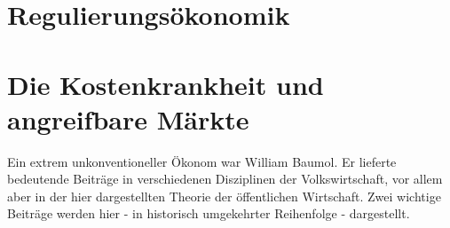 \section{Regulierungsökonomik}
\label{sec: Regulierung}





\section{Die Kostenkrankheit und angreifbare Märkte}
\label{Disease}
Ein extrem unkonventioneller Ökonom war William Baumol. Er lieferte bedeutende Beiträge in verschiedenen Disziplinen der Volkswirtschaft, vor allem aber in der hier dargestellten Theorie der öffentlichen Wirtschaft. Zwei wichtige Beiträge werden hier - in historisch umgekehrter Reihenfolge - dargestellt.

